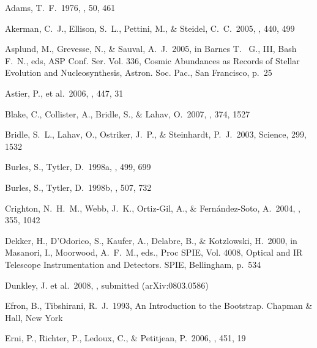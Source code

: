 \documentclass[useAMS,usenatbib]{mn2e}
\begin{document}
\begin{thebibliography}{}
\small
\itemindent -0.48cm

\bibitem[]{} Adams, T.~F.\ 1976, \aap, 50, 461


\bibitem[Akerman et al.(2005)]{} Akerman, C.~J., Ellison, S.~L.,
Pettini, M., \& Steidel, C.~C.\ 2005, \aap,  440, 499

 Asplund, M., Grevesse,
N., \& Sauval, A.~J.\ 2005, in
Barnes T.~ G., III, Bash F.~N., eds,
ASP Conf. Ser. Vol. 336,
Cosmic Abundances as Records of Stellar
Evolution and Nucleosynthesis,
Astron. Soc. Pac., San Francisco,  p.~25

Astier, P., et al.\ 2006, \aap, 447, 31


 Blake, C., Collister, A.,
Bridle, S., \& Lahav, O.\ 2007, \mnras, 374, 1527

 Bridle, S.~L., Lahav,
O., Ostriker, J.~P., \& Steinhardt, P.~J.\ 2003, Science, 299, 1532

\bibitem[]{} Burles, S., Tytler, D.\ 1998a, \apj, 499, 699

\bibitem[]{} Burles, S., Tytler, D.\ 1998b, \apj, 507, 732

 Crighton, N.~H.~M.,
Webb, J.~K., Ortiz-Gil, A.,
\& Fern{\'a}ndez-Soto, A.\ 2004, \mnras, 355, 1042

 Dekker, H., D'Odorico,
S., Kaufer, A., Delabre, B., \& Kotzlowski, H.\ 2000,
in Masanori, I., Moorwood, A.~F.~M., eds.,
Proc SPIE, Vol. 4008,
Optical and IR Telescope Instrumentation and Detectors.
SPIE, Bellingham, p.~534

\bibitem[]{} Dunkley, J. et al.\ 2008, \apjs,  submitted (arXiv:0803.0586)

\bibitem[]{} Efron, B., Tibshirani, R.~J.\ 1993, An Introduction to the
Bootstrap. Chapman \& Hall, New York

 Erni, P., Richter, P.,
Ledoux, C., \& Petitjean, P.\ 2006, \aap, 451, 19



\end{thebibliography}
\end{document}
